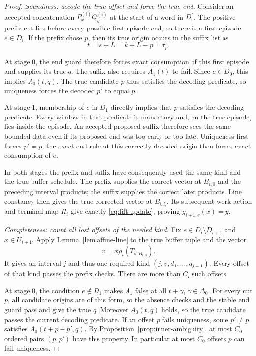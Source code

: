 \begin{proof}
\emph{Soundness: decode the true offset and force the true end.}
Consider an accepted concatenation
$P_x^{(i)}Q_y^{(i)}$ at the start of a word in $D_i^*$.
The positive prefix cut lies before every possible first episode
end, so there is a first episode $e\in D_i$.  If the prefix chose
$p$, then its true origin occurs in the suffix list as
\[
 t=s+L=k+L-p=\tau_p.
\]

At stage $0$, the end guard therefore forces exact consumption of
this first episode and supplies its true $q$.  The suffix also
requires $A_1(t)$ to fail.  Since $e\in D_0$, this implies
$A_0(t,q)$.  The true candidate $p$ thus satisfies the decoding
predicate, so uniqueness forces the decoded $p'$ to equal $p$.

At stage $1$, membership of $e$ in $D_1$ directly implies that
$p$ satisfies the decoding predicate.  Every window in that
predicate is mandatory and, on the true episode, lies inside the
episode.  An accepted proposed suffix therefore sees the same
bounded data even if its proposed end was too early or too late.
Uniqueness first forces $p'=p$; the exact end rule at this correctly
decoded origin then forces exact consumption of $e$.

In both stages the prefix and suffix have consequently used the
same kind and the true buffer schedule.  The prefix supplies the
correct vector at $B_{i,0}$ and the preceding interval products;
the suffix supplies the correct later products.  Line constancy
then gives the true corrected vector at $B_{i,l_i}$.  Its subsequent
work action and terminal map $H_i$ give exactly
\eqref{eq:lift-update}, proving $g_{i+1,e}(x)=y$.

\emph{Completeness: count all lost offsets of the needed kind.}
Fix $e\in D_i\setminus D_{i+1}$ and
$x\in U_{i+1}$.  Apply Lemma~\ref{lem:affine-line} to the true
buffer tuple and the vector
\[
 v=x\rho_i(T_{s,B_{i,0}}).
\]
It gives an interval $j$ and thus one required kind
$(j,v,d_1,\ldots,d_{j-1})$.  Every offset of that kind passes the
prefix checks.  There are more than $C_i$ such offsets.

At stage $0$, the condition $e\notin D_1$ makes $A_1$ false at
all $t+\gamma$, $\gamma\in\Delta_0$.  For every cut $p$, all
candidate origins are of this form, so the absence checks and
the stable end guard pass and give the true $q$.  Moreover
$A_0(t,q)$ holds, so the true candidate passes the current
decoding predicate.  If an offset $p$ fails uniqueness, some
$p'\ne p$ satisfies $A_0(t+p-p',q)$.  By
Proposition~\ref{prop:inner-ambiguity}, at most $C_0$ ordered pairs
$(p,p')$ have this property.  In particular at most $C_0$ offsets
$p$ can fail uniqueness.


\end{proof}

